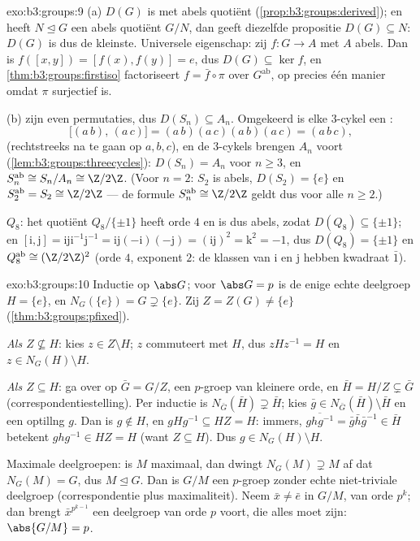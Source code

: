 \begin{solution}{exo:b3:groups:9}
(a) $D(G)$ is  met abels quotiënt
(\cref{prop:b3:groups:derived}); en heeft $N \trianglelefteq G$ een
abels quotiënt $G/N$, dan geeft diezelfde propositie $D(G)
\subseteq N$: $D(G)$ is dus de kleinste. Universele eigenschap: zij
$f \colon G \to A$ met $A$ abels. Dan is $f([x,y]) = [f(x), f(y)] =
e$, dus $D(G) \subseteq \ker f$, en
\cref{thm:b3:groups:firstiso} factoriseert $f = \bar f \circ \pi$
over $G^{\mathrm{ab}}$, op precies één manier omdat $\pi$
surjectief is.

(b)  zijn even permutaties, dus $D(S_n) \subseteq A_n$.
Omgekeerd is elke $3$-cykel een :
\[
\bigl[(a\,b),\,(a\,c)\bigr] = (a\,b)(a\,c)(a\,b)(a\,c) =
(a\,b\,c),
\]
(rechtstreeks na te gaan op $a, b, c$), en de $3$-cykels brengen
$A_n$ voort (\cref{lem:b3:groups:threecycles}): $D(S_n) = A_n$ voor
$n \geq 3$, en $S_n^{\mathrm{ab}} \cong S_n/A_n \cong \Z/2\Z$.
(Voor $n = 2$: $S_2$ is abels, $D(S_2) = \{e\}$ en
$S_2^{\mathrm{ab}} = S_2 \cong \Z/2\Z$ --- de formule
$S_n^{\mathrm{ab}} \cong \Z/2\Z$ geldt dus voor alle $n \geq 2$.)

$Q_8$: het quotiënt $Q_8/\{\pm 1\}$ heeft orde $4$ en is dus abels,
zodat $D(Q_8) \subseteq \{\pm 1\}$; en $[\mathrm i, \mathrm j] =
\mathrm i \mathrm j \mathrm i^{-1}\mathrm j^{-1} = \mathrm i\mathrm
j(-\mathrm i)(-\mathrm j) = (\mathrm i \mathrm j)^2 = \mathrm k^2 =
-1$, dus $D(Q_8) = \{\pm 1\}$ en $Q_8^{\mathrm{ab}} \cong
(\Z/2\Z)^2$ (orde $4$, exponent $2$: de klassen van $\mathrm i$ en
$\mathrm j$ hebben kwadraat $\bar 1$).
\end{solution}

\begin{solution}{exo:b3:groups:10}
Inductie op $\abs G$; voor $\abs G = p$ is de enige echte deelgroep
$H = \{e\}$, en $N_G(\{e\}) = G \supsetneq \{e\}$. Zij $Z = Z(G)
\neq \{e\}$ (\cref{thm:b3:groups:pfixed}).

\emph{Als $Z \not\subseteq H$}: kies $z \in Z \setminus H$; $z$
commuteert met $H$, dus $zHz^{-1} = H$ en $z \in N_G(H) \setminus
H$.

\emph{Als $Z \subseteq H$}: ga over op $\bar G = G/Z$, een
$p$-groep van kleinere orde, en $\bar H = H/Z \subsetneq \bar G$
(correspondentiestelling). Per inductie is $N_{\bar G}(\bar H)
\supsetneq \bar H$; kies $\bar g \in N_{\bar G}(\bar H) \setminus
\bar H$ en een optillng $g$. Dan is $g \notin H$, en $gHg^{-1}
\subseteq HZ = H$: immers, $\overline{ghg^{-1}} = \bar g \bar h
\bar g^{-1} \in \bar H$ betekent $ghg^{-1} \in HZ = H$ (want $Z
\subseteq H$). Dus $g \in N_G(H)\setminus H$.

Maximale deelgroepen: is $M$ maximaal, dan dwingt $N_G(M)
\supsetneq M$ af dat $N_G(M) = G$, dus $M \trianglelefteq G$. Dan
is $G/M$ een $p$-groep zonder echte niet-triviale deelgroep
(correspondentie plus maximaliteit). Neem $\bar x \neq \bar e$ in
$G/M$, van orde $p^k$; dan brengt $\bar x^{p^{k-1}}$ een deelgroep
van orde $p$ voort, die alles moet zijn: $\abs{G/M} = p$.
\end{solution}

